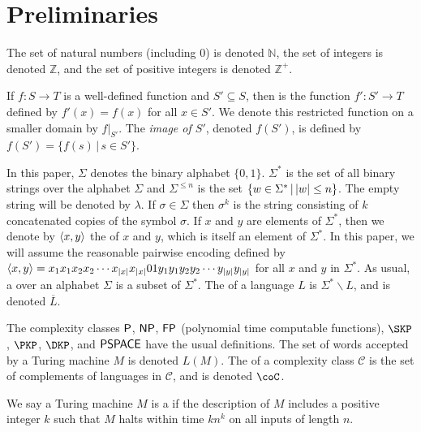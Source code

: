 \section{Preliminaries}
\label{sec:preliminaries}

The set of natural numbers (including $0$) is denoted $\mathbb{N}$, the set of integers is denoted $\mathbb{Z}$, and the set of positive integers is denoted $\mathbb{Z}^+$.

If $f\colon S\to T$ is a well-defined function and $S'\subseteq S$, then  is the function $f'\colon S'\to T$ defined by $f'(x)=f(x)$ for all $x\in S'$.
We denote this restricted function on a smaller domain by $f|_{S'}$.
The \emph{image of $S'$}, denoted $f(S')$, is defined by $f(S') = \{f(s) \, | \, s \in S'\}$.

In this paper, $\Sigma$ denotes the binary alphabet $\{0, 1\}$.
$\Sigma^*$ is the set of all binary strings over the alphabet $\Sigma$ and $\Sigma^{\leq n}$ is the set $\lb w\in\Sigma^* \st |w|\leq n \rb$.
The empty string will be denoted by $\lambda$.
If $\sigma\in\Sigma$ then $\sigma^k$ is the string consisting of $k$ concatenated copies of the symbol $\sigma$.
If $x$ and $y$ are elements of $\Sigma^*$, then we denote by $\pair{x}{y}$ the  of $x$ and $y$, which is itself an element of $\Sigma^*$.
In this paper, we will assume the reasonable pairwise encoding defined by $\pair{x}{y}=x_1x_1x_2x_2\cdots x_{|x|}x_{|x|}01y_1y_1y_2y_2\cdots y_{|y|}y_{|y|}$ for all $x$ and $y$ in $\Sigma^*$.
As usual, a  over an alphabet $\Sigma$ is a subset of $\Sigma^*$.
The  of a language $L$ is $\Sigma^*\backslash L$, and is denoted $\overline{L}$.

The complexity classes $\P$, $\NP$, $\FP$ (polynomial time computable functions), $\SKP$, $\PKP$, $\DKP$, and $\PSPACE$ have the usual definitions.
The set of words accepted by a Turing machine $M$ is denoted $L(M)$.
The  of a complexity class $\mathcal{C}$ is the set of complements of languages in $\mathcal{C}$, and is denoted $\coC$.

We say a Turing machine $M$ is a  if the description of $M$ includes a positive integer $k$ such that $M$ halts within time $kn^k$ on all inputs of length $n$.

